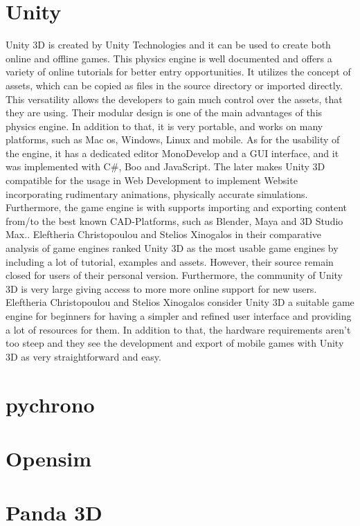 \documentclass[
	12pt, 
	a4paper, 
]{article}
\begin{document}
	\section{Unity}
	Unity 3D is created by Unity Technologies and it can be used to create both online and offline games. This physics engine is well documented and offers a variety of online tutorials for better entry opportunities. It utilizes the concept of assets, which can be copied as files in the source directory or imported directly. This versatility allows the developers to gain much control over the assets, that they are using. Their modular design is one of the main advantages of this physics engine. In addition to that, it is very portable, and works on many platforms, such as Mac os, Windows, Linux and mobile.\cite{mat2014using}\newline
	As for the usability of the engine, it has a dedicated editor MonoDevelop and a GUI interface, and it was implemented with C\#, Boo and JavaScript.\cite{christopoulou2017overview} The later makes Unity 3D compatible for the usage in Web Development to implement Website incorporating rudimentary animations, physically accurate simulations. Furthermore, the game engine is with supports importing and exporting content from/to the best known CAD-Platforms, such as Blender, Maya and 3D Studio Max.\cite{christopoulou2017overview}.\newline
	Eleftheria Christopoulou and Stelios Xinogalos in their comparative analysis of game engines ranked Unity 3D as the most usable game engines by including a lot of tutorial, examples and assets. However, their source remain closed for users of their personal version. Furthermore, the community of Unity 3D is very large giving access to more more online support for new users\cite{christopoulou2017overview}. Eleftheria Christopoulou and Stelios Xinogalos consider Unity 3D a suitable game engine for beginners for having a simpler and refined user interface and providing a lot of resources for them. In addition to that, the hardware requirements aren't too steep and they see the development and export of mobile games with Unity 3D as very straightforward and easy\cite{christopoulou2017overview}.
	\section{pychrono}
	\section{Opensim}
	\section{Panda 3D}
	\printbibliography
\end{document}

